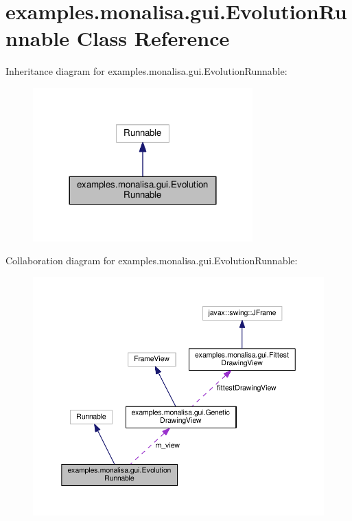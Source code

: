 \hypertarget{classexamples_1_1monalisa_1_1gui_1_1_evolution_runnable}{\section{examples.\-monalisa.\-gui.\-Evolution\-Runnable Class Reference}
\label{classexamples_1_1monalisa_1_1gui_1_1_evolution_runnable}
}


Inheritance diagram for examples.\-monalisa.\-gui.\-Evolution\-Runnable\-:
\nopagebreak
\begin{figure}[H]
\begin{center}
\leavevmode
\includegraphics[width=240pt]{classexamples_1_1monalisa_1_1gui_1_1_evolution_runnable__inherit__graph}
\end{center}
\end{figure}


Collaboration diagram for examples.\-monalisa.\-gui.\-Evolution\-Runnable\-:
\nopagebreak
\begin{figure}[H]
\begin{center}
\leavevmode
\includegraphics[width=350pt]{classexamples_1_1monalisa_1_1gui_1_1_evolution_runnable__coll__graph}
\end{center}
\end{figure}
